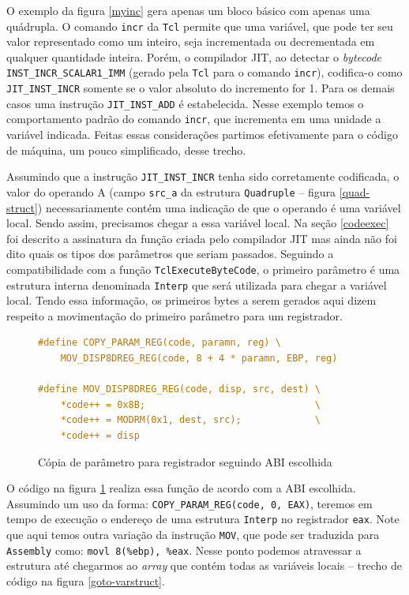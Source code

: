 O exemplo da figura \ref{myinc} gera apenas um bloco básico com
apenas uma quádrupla. O comando \verb!incr! da \texttt{Tcl} permite
que uma variável, que pode ter seu valor representado como um inteiro,
seja incrementada ou decrementada em qualquer quantidade inteira.
Porém, o compilador
JIT, ao detectar o \textit{bytecode} \verb!INST_INCR_SCALAR1_IMM! (gerado pela
\texttt{Tcl} para o comando \verb!incr!), codifica-o
como \verb!JIT_INST_INCR! somente se o valor absoluto do incremento
for 1. Para os demais casos uma instrução \verb!JIT_INST_ADD! é estabelecida.
Nesse exemplo temos o comportamento padrão do comando \verb!incr!, que
incrementa em uma unidade a variável indicada. Feitas essas
considerações partimos efetivamente para o código de máquina, um pouco
simplificado, desse trecho.

Assumindo que a instrução \verb!JIT_INST_INCR! tenha sido corretamente
codificada, o valor do operando A (campo \verb!src_a! da estrutura
\verb!Quadruple! -- figura \ref{quad-struct}) necessariamente contém uma
indicação de que o operando é uma variável local. Sendo assim,
precisamos chegar a essa variável local. Na seção \ref{codeexec} foi
descrito a assinatura da função criada pelo compilador JIT mas ainda
não foi dito quais os tipos dos parâmetros que seriam
passados. Seguindo a compatibilidade com a função
\verb!TclExecuteByteCode!, o primeiro parâmetro é uma estrutura
interna denominada \verb!Interp! que será utilizada para chegar a
variável local. Tendo essa informação, os primeiros bytes a serem
gerados aqui dizem respeito a movimentação do primeiro parâmetro para
um registrador.
\begin{figure}[h]
  \centering
  \begin{lstlisting}[language=C]
#define COPY_PARAM_REG(code, paramn, reg) \
    MOV_DISP8DREG_REG(code, 8 + 4 * paramn, EBP, reg)

#define MOV_DISP8DREG_REG(code, disp, src, dest) \
    *code++ = 0x8B;                              \
    *code++ = MODRM(0x1, dest, src);             \
    *code++ = disp
  \end{lstlisting}
  \caption{Cópia de parâmetro para registrador seguindo ABI escolhida\label{copy-param}}
\end{figure}
O código na figura \ref{copy-param} realiza essa
função de acordo com a ABI escolhida. Assumindo um uso da forma:
\verb!COPY_PARAM_REG(code, 0, EAX)!, teremos em tempo de execução o
endereço de uma estrutura \verb!Interp! no registrador
\verb!eax!. Note que aqui temos outra variação da instrução
\verb!MOV!, que pode ser traduzida para \texttt{Assembly} como:
\verb!movl 8(%ebp), %eax!. Nesse ponto podemos atravessar a estrutura até
chegarmos ao \textit{array} que contém todas as variáveis locais --
trecho de código na figura \ref{goto-varstruct}.

